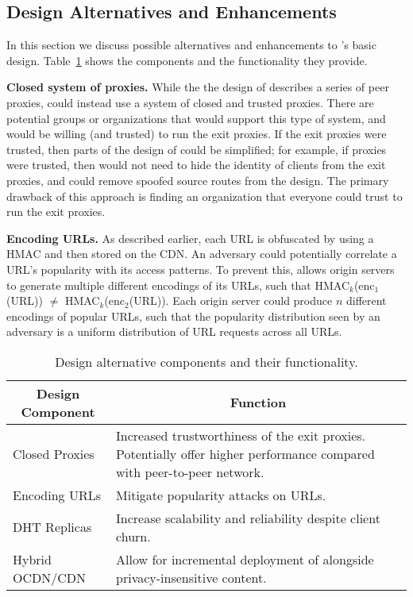 \subsection{Design Alternatives and Enhancements}\label{sec:enhancements}

In this section we discuss possible alternatives and enhancements to \system{}'s basic design. Table~\ref{tab:alternatives} shows the components and the functionality they provide.

\textbf{Closed system of proxies.} While the the design of \system{} describes a series of peer proxies, \system{} could 
instead use a system of closed and trusted proxies.  There are potential groups or organizations that would 
support this type of system, and would be willing (and trusted) to run the exit proxies.  If the exit
proxies were trusted, then parts of the design of \system{} could be simplified; for example, if proxies 
were trusted, then \system{} would not need to hide the identity of clients from the exit proxies, and could 
remove spoofed source routes from the design.  The primary drawback of this approach is finding an organization 
that everyone could trust to run the exit proxies.  

\textbf{Encoding URLs.}
As described earlier, each URL is obfuscated by using a HMAC and then stored on the CDN.  An adversary 
could potentially correlate a URL's popularity with its access patterns.  To prevent this, \system{} allows 
origin servers to generate multiple different encodings of its URLs, such that HMAC$_k$(enc$_1$(URL)) $\neq$ 
HMAC$_k$(enc$_2$(URL)).  Each origin server could produce $n$ different encodings of popular URLs, such that 
the popularity distribution seen by an adversary is a uniform distribution of URL requests across all URLs.  

\begin{table}[t!]
\small
\centering
\begin{tabular}{ l  p{1.9in} } 
 \multicolumn{1}{c}{\bf Design Component} & \multicolumn{1}{c}{\bf Function} \\
 \hline \hline
 Closed Proxies & {Increased trustworthiness of the exit proxies. Potentially offer higher performance compared with peer-to-peer network.} \\
 Encoding URLs & {Mitigate popularity attacks on URLs.} \\
 DHT Replicas & {Increase scalability and reliability despite client churn.} \\
 Hybrid OCDN/CDN & {Allow for incremental deployment of \system{} alongside privacy-insensitive content.} \\
 \hline
\end{tabular}
\caption{Design alternative components and their functionality.}
\label{tab:alternatives}
\end{table}


